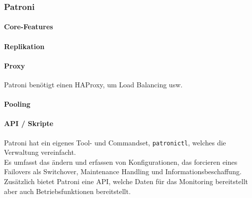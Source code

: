 
\subsubsection{Patroni}
\begin{flushleft}
\begin{flushleft}
    \paragraph{Core-Features}

\end{flushleft}
\end{flushleft}
\begin{flushleft}
    \paragraph{Replikation}
\end{flushleft}
\begin{flushleft}
    \paragraph{Proxy}
    Patroni benötigt einen \Gls{HAProxy}, um Load Balancing usw. \cite{VYXTI7BS}
\end{flushleft}
\begin{flushleft}
    \paragraph{Pooling}

\end{flushleft}
\begin{flushleft}
    \paragraph{API / Skripte}
    Patroni hat ein eigenes Tool- und Commandset, \texttt{patronictl}, welches die Verwaltung vereinfacht.\\
    Es umfasst das ändern und erfassen von Konfigurationen, das forcieren eines Failovers als Switchover, Maintenance Handling und Informationsbeschaffung.\\

    Zusätzlich bietet Patroni eine API, welche Daten für das Monitoring bereitstellt aber auch Betriebsfunktionen bereitstellt.\\
\end{flushleft}
